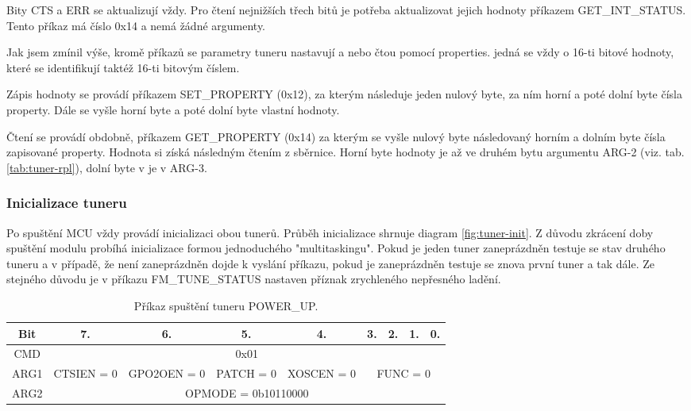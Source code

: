 Bity CTS a ERR se aktualizují vždy. Pro čtení nejnižších třech bitů je potřeba aktualizovat jejich hodnoty příkazem GET\_INT\_STATUS. Tento příkaz má číslo 0x14 a nemá žádné argumenty.

Jak jsem zmínil výše, kromě příkazů se parametry tuneru nastavují a nebo čtou pomocí properties. jedná se vždy o 16-ti bitové hodnoty, které se identifikují taktéž 16-ti bitovým číslem. 

Zápis hodnoty se provádí příkazem SET\_PROPERTY (0x12), za kterým následuje jeden nulový byte, za ním horní a poté dolní byte čísla property. Dále se vyšle horní byte a poté dolní byte vlastní hodnoty. 

Čtení se provádí obdobně, příkazem GET\_PROPERTY (0x14) za kterým se vyšle nulový byte následovaný horním a dolním byte čísla zapisované property. Hodnota si získá následným čtením z \iic sběrnice. Horní byte hodnoty je až ve druhém bytu argumentu ARG-2 (viz. tab. \ref{tab:tuner-rpl}), dolní byte v je v ARG-3.


\subsubsection{Inicializace tuneru}

Po spuštění MCU vždy provádí inicializaci obou tunerů. Průběh inicializace shrnuje diagram \ref{fig:tuner-init}. Z důvodu zkrácení doby spuštění modulu probíhá inicializace formou jednoduchého "multitaskingu". Pokud je jeden tuner zaneprázdněn testuje se stav druhého tuneru a v případě, že není zaneprázdněn dojde k vyslání příkazu, pokud je zaneprázdněn testuje se znova první  tuner a tak dále. Ze stejného důvodu je v příkazu FM\_TUNE\_STATUS nastaven příznak zrychleného nepřesného ladění.


\begin{table}[ht!]
\begin{center}
\begin{tabular}{|c|c|c|c|c|c|c|c|c|}
\hline 
Bit & 7. & 6. & 5. & 4. & 3. & 2. & 1. & 0. \\ 
\hline 
CMD & \multicolumn{8}{c|}{0x01} \\ 
\hline 
ARG1 & CTSIEN = 0 & GPO2OEN = 0 & PATCH = 0 & XOSCEN = 0 & \multicolumn{4}{c|}{FUNC = 0} \\ 
\hline 
ARG2 & \multicolumn{8}{c|}{OPMODE = 0b10110000} \\ 
\hline 
\end{tabular} 
\end{center}
\caption{Příkaz spuštění tuneru POWER\_UP.}
\label{tab:tuner-power-up} 
\end{table}

